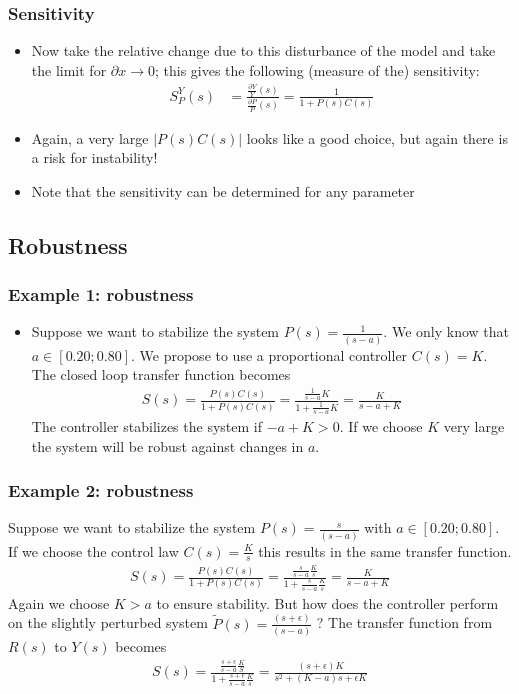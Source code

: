 \begin{frame}
	\frametitle{Sensitivity}
	\begin{itemize}
		\item Now take the relative change due to this disturbance of the model and take the limit for $\partial x \rightarrow 0$; this gives the following (measure of the) sensitivity:
		\begin{align*}
			S_P^Y(s) &= \frac{\frac{\partial Y}{Y}(s)}{\frac{\partial P}{P}(s)} = \frac{1}{1 + P(s)C(s)}
		\end{align*}
		\item Again, a very large $\left|P(s)C(s)\right|$ looks like a good choice, but again there is a risk for instability!
		\item Note that the sensitivity can be determined for any parameter	
	\end{itemize}
\end{frame}


\subsection[Robustness]{Robustness}
\begin{frame}
	\frametitle{Example 1: robustness}
	\begin{itemize}
		\item Suppose we want to stabilize the system $P(s)=\frac{1}{(s - a)}$.  We only know that $a \in [0.20;0.80]$. We propose to use a proportional controller $C(s)=K$.
		The closed loop transfer function becomes
		\begin{align*}
			S(s) = \frac{P(s)C(s)}{1+P(s)C(s)} = \frac{\frac{1}{s-a}K}{1+\frac{1}{s-a}K} = \frac{K}{s-a+K}
		\end{align*}
		The controller stabilizes the system if $ - a+K>0$. If we choose $K$ very large the system will be robust against changes in $a$.
		
	\end{itemize}
\end{frame}


\begin{frame}
	\frametitle{Example 2: robustness}
	Suppose we want to stabilize the system $P(s)=\frac{s}{(s - a)}$ with $a\in[0.20;0.80]$. If we choose the control law $C(s)=\frac{K}{s}$ this results in the same transfer function.
	\begin{align*}
		S(s) = \frac{P(s)C(s)}{1+P(s)C(s)} = \frac{\frac{s}{s-a}\frac{K}{s}}{1+\frac{s}{s-a} \frac{K}{s}} = \frac{K}{s-a+K}
	\end{align*}
	Again we choose $K>a$ to ensure stability.
	But how does the controller perform on the slightly perturbed system $\tilde{P}(s)=\frac{(s+\epsilon)}{(s - a)}$  ?
	The transfer function from $R(s)$ to $Y(s)$ becomes
	\begin{align*}
		S(s) = \frac{\frac{s+\epsilon}{s-a} \frac{K}{S}}{1+\frac{s+\epsilon}{s-a}\frac{K}{s}}
		= \frac{(s+\epsilon)K}{s^2 + (K-a)s + \epsilon K}
	\end{align*}
\end{frame}

